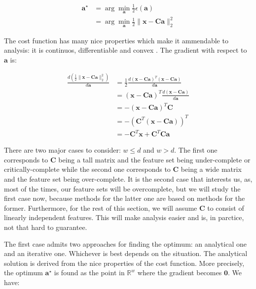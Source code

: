 \documentclass[12pt,a4paper,oneside,english]{UPBThesis}
\newcommand{\hcweightspace}{\mathbb{R}^w}
\begin{document}
\begin{align*}
\textbf{a}^{\star} & = \arg\min_\textbf{a} \frac{1}{2} \epsilon(\textbf{a}) \\
& = \arg\min_{\textbf{a}} \frac{1}{2} \| \textbf{x} - \textbf{C}\textbf{a} \|_2^2
\end{align*}

The cost function has many nice properties which make it ammendable to analysis: it is continuos, differentiable and convex \cite{elements-statistical-learning}. The gradient with respect to $\textbf{a}$ is:

\begin{align*}
\frac{d \left( \frac{1}{2}\|\textbf{x} - \textbf{C}\textbf{a}\|_2^2 \right)}{d\textbf{a}} & = \frac{1}{2} \frac{d {\left( \textbf{x} - \textbf{C}\textbf{a} \right)}^T\left( \textbf{x} - \textbf{C}\textbf{a} \right)}{d\textbf{a}} \\
& = {\left( \textbf{x} - \textbf{C}\textbf{a} \right)}^T \frac{d \left( \textbf{x} - \textbf{C}\textbf{a} \right)}{d\textbf{a}} \\
& = - {\left( \textbf{x} - \textbf{C}\textbf{a} \right)}^T \textbf{C} \\
& = - {\left( \textbf{C}^T \left( \textbf{x} - \textbf{C}\textbf{a} \right) \right)}^T \\
& = - \textbf{C}^T \textbf{x} + \textbf{C}^T\textbf{C}\textbf{a}
\end{align*}

There are two major cases to consider: $w \leq d$ and $w > d$. The first one corresponds to $\textbf{C}$ being a tall matrix and the feature set being under-complete or critically-complete while the second one corresponds to $\textbf{C}$ being a wide matrix and the feature set being over-complete. It is the second case that interests us, as, most of the times, our feature sets will be overcomplete, but we will study the first case now, because methods for the latter one are based on methods for the former. Furthermore, for the rest of this section, we will assume $\textbf{C}$ to consist of linearly independent features. This will make analysis easier and is, in parctice, not that hard to guarantee.

The first case admits two approaches for finding the optimum: an analytical one and an iterative one. Whichever is best depends on the situation. The analytical solution is derived from the nice properties of the cost function. More precisely, the optimum $\textbf{a}^\star$ is found as the point in $\hcweightspace$ where the gradient becomes $\textbf{0}$. We have:
\end{document}
